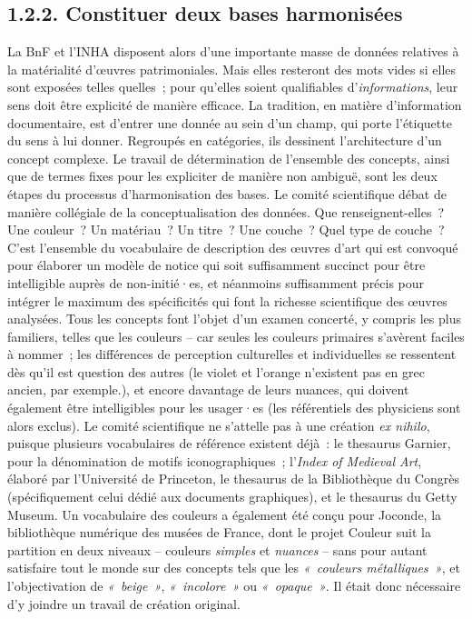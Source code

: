 \documentclass[a4paper,12pt, twoside]{book}
\begin{document}
\subsection*{1.2.2. Constituer deux bases harmonisées}

La BnF et l’INHA disposent alors d’une importante masse de données relatives à la matérialité d’œuvres patrimoniales. Mais elles resteront des mots vides si elles sont exposées telles quelles~; pour qu’elles soient qualifiables d’\textit{informations}, leur sens doit être explicité de manière efficace. La tradition, en matière d’information documentaire, est d’entrer une donnée au sein d’un champ, qui porte l’étiquette du sens à lui donner. Regroupés en catégories, ils dessinent l’architecture d’un concept complexe. Le travail de détermination de l’ensemble des concepts, ainsi que de termes fixes pour les expliciter de manière non ambiguë, sont les deux étapes du processus d’harmonisation des bases. Le comité scientifique débat de manière collégiale de la conceptualisation des données. Que renseignent-elles~? Une couleur~? Un matériau~? Un titre~? Une couche~? Quel type de couche~? C’est l’ensemble du vocabulaire de description des œuvres d’art qui est convoqué pour élaborer un modèle de notice qui soit suffisamment succinct pour être intelligible auprès de non-initié·es, et néanmoins suffisamment précis pour intégrer le maximum des spécificités qui font la richesse scientifique des œuvres analysées. Tous les concepts font l’objet d’un examen concerté, y compris les plus familiers, telles que les couleurs – car seules les couleurs primaires s’avèrent faciles à nommer~; les différences de perception culturelles et individuelles se ressentent dès qu’il est question des autres (le violet et l’orange n’existent pas en grec ancien, par exemple.), et encore davantage de leurs nuances, qui doivent également être intelligibles pour les usager·es (les référentiels des physiciens sont alors exclus). Le comité scientifique ne s’attelle pas à une création \textit{ex nihilo}, puisque plusieurs vocabulaires de référence existent déjà~: le thesaurus Garnier, pour la dénomination de motifs iconographiques~; l’\textit{Index of Medieval Art}, élaboré par l’Université de Princeton, le thesaurus de la Bibliothèque du Congrès (spécifiquement celui dédié aux documents graphiques), et le thesaurus du Getty Museum. Un vocabulaire des couleurs a également été conçu pour Joconde, la bibliothèque numérique des musées de France, dont le projet Couleur suit la partition en deux niveaux – couleurs \textit{simples} et \textit{nuances} – sans pour autant satisfaire tout le monde sur des concepts tels que les \textit{«~couleurs métalliques~»}, et l’objectivation de \textit{«~beige~»}, \textit{«~incolore~»} ou \textit{«~opaque~»}. Il était donc nécessaire d’y joindre un travail de création original.
\end{document}

